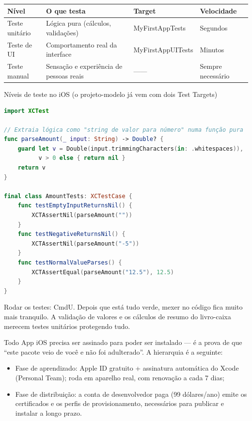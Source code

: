 \begin{center}
\begin{tabularx}{\linewidth}{|X|X|X|X|}
\hline
\textbf{Nível} & \textbf{O que testa} & \textbf{Target} & \textbf{Velocidade} \tabularnewline
\hline
Teste unitário & Lógica pura (cálculos, validações) & MyFirstAppTests & Segundos \tabularnewline
Teste de UI & Comportamento real da interface & MyFirstAppUITests & Minutos \tabularnewline
Teste manual & Sensação e experiência de pessoas reais & —— & Sempre necessário \tabularnewline
\hline
\end{tabularx}
\end{center}

\begin{center}\small\color{gray}Níveis de teste no iOS (o projeto-modelo já vem com dois Test Targets)\end{center}

\begin{lstlisting}[language=Swift]
import XCTest

// Extraia lógica como "string de valor para número" numa função pura
func parseAmount(_ input: String) -> Double? {
    guard let v = Double(input.trimmingCharacters(in: .whitespaces)),
          v > 0 else { return nil }
    return v
}

final class AmountTests: XCTestCase {
    func testEmptyInputReturnsNil() {
        XCTAssertNil(parseAmount(""))
    }
    func testNegativeReturnsNil() {
        XCTAssertNil(parseAmount("-5"))
    }
    func testNormalValueParses() {
        XCTAssertEqual(parseAmount("12.5"), 12.5)
    }
}
\end{lstlisting}

Rodar os testes: CmdU. Depois que está tudo verde, mexer no código fica muito mais tranquilo. A validação de valores e os cálculos de resumo do livro-caixa merecem testes unitários protegendo tudo.


Todo App iOS precisa ser assinado para poder ser instalado — é a prova de que “este pacote veio de você e não foi adulterado”. A hierarquia é a seguinte:

\begin{itemize}
  \item Fase de aprendizado: Apple ID gratuito + assinatura automática do Xcode (Personal Team); roda em aparelho real, com renovação a cada 7 dias;
  \item Fase de distribuição: a conta de desenvolvedor paga (99 dólares/ano) emite os certificados e os perfis de provisionamento, necessários para publicar e instalar a longo prazo.
\end{itemize}

